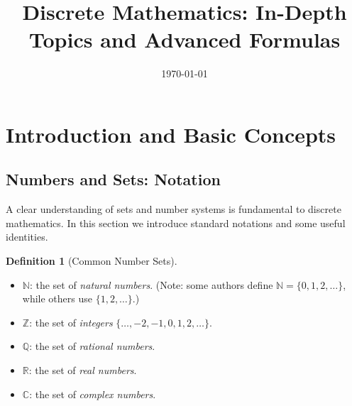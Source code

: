 \documentclass[12pt]{article}
\theoremstyle{definition}
\newtheorem{definition}[theorem]{Definition}
\begin{document}
\title{Discrete Mathematics: In-Depth Topics and Advanced Formulas}
\author{}
\date{\today}
\maketitle

\tableofcontents

\section{Introduction and Basic Concepts}

\subsection{Numbers and Sets: Notation}

A clear understanding of sets and number systems is fundamental to discrete mathematics. In this section we introduce standard notations and some useful identities.

\begin{definition}[Common Number Sets]
  
  \begin{itemize}[itemsep=3pt]
    \item \(\mathbb{N}\): the set of \emph{natural numbers}. (Note: some authors define \(\mathbb{N} = \{0,1,2,\dots\}\), while others use \(\{1,2,\dots\}\).)
    \item \(\mathbb{Z}\): the set of \emph{integers} \( \{ \dots, -2, -1, 0, 1, 2, \dots \}\).
    \item \(\mathbb{Q}\): the set of \emph{rational numbers}.
    \item \(\mathbb{R}\): the set of \emph{real numbers}.
    \item \(\mathbb{C}\): the set of \emph{complex numbers}.
  \end{itemize}
\end{definition}
\end{document}
